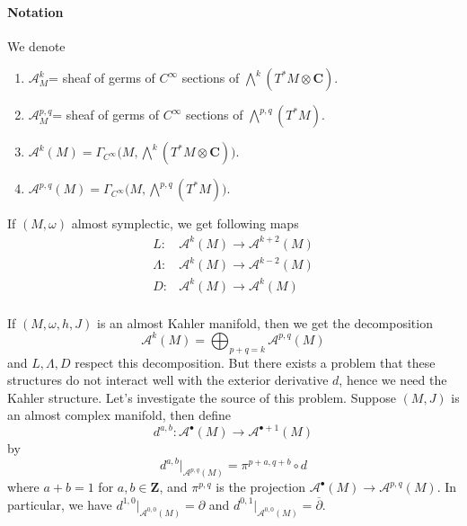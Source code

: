 \documentclass[
11pt, %
letterpaper， %
oneside, %
headinclude,footinclude, %
BCOR5mm, %
]{scrartcl}
\newcommand{\Z}{{\mathbf{Z}}}
\newcommand{\C}{{\mathbf{C}}}
\begin{document}
\paragraph{Notation}
We denote 
\begin{enumerate}
	\item $\mathcal{A}^k_M$= sheaf of germs of $C^{\infty}$ sections of $\bigwedge^k(T^*M\otimes \C)$.
	\item $\mathcal{A}^{p,q}_M$= sheaf of germs of $C^{\infty}$ sections of $\bigwedge^{p,q}(T^*M)$.
	\item $\mathcal{A}^k(M)= \Gamma_{C^{\infty}}\big(M,\bigwedge^k(T^*M\otimes \C)\big)$.
	 	\item $\mathcal{A}^{p,q}(M)= \Gamma_{C^{\infty}}\big(M,\bigwedge^{p,q}(T^*M)\big)$.
\end{enumerate}

If $(M, \omega)$ almost symplectic, we get following maps
\begin{align*}
L:&\mathcal{A}^k(M) \to \mathcal{A}^{k+2}(M)\\ \Lambda:&\mathcal{A}^k(M) \to \mathcal{A}^{k-2}(M)\\ 
D:&\mathcal{A}^k(M) \to \mathcal{A}^{k}(M)\\ 
\end{align*}

If $(M,\omega,h,J)$ is an almost Kahler manifold, then we get the decomposition
\begin{equation*}
\mathcal{A}^k(M) =\bigoplus_{p+q=k}\mathcal{A}^{p,q}(M) 
\end{equation*}
and $L, \Lambda, D$ respect this decomposition. But there exists a problem that these structures do not interact well with the exterior derivative $d$, hence we need the Kahler structure. Let's investigate the source of this problem. Suppose $(M,J)$ is an almost complex manifold, then define
\begin{equation*}
d^{a,b}: \mathcal{A}^{\bullet}(M) \to \mathcal{A}^{\bullet+1}(M)
\end{equation*}
by
\begin{equation*}
d^{a,b}\big|_{\mathcal{A}^{p,q}(M)}=\pi^{p+a,q+b}\circ d 
\end{equation*}
where $a+b=1$ for $a,b\in \Z$, and $\pi^{p,q}$ is the projection $\mathcal{A}^{\bullet}(M)\to \mathcal{A}^{p,q}(M)$. In particular, we have $d^{1,0}|_{\mathcal{A}^{0,0}(M)}=\partial$ and $d^{0,1}|_{\mathcal{A}^{0,0}(M)}=\overline{\partial}$.
\end{document}
